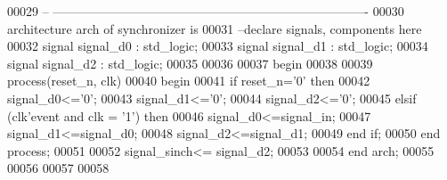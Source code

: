 \begin{DoxyCode}
00029 \textcolor{keyword}{-- ----------------------------------------------------------------------------}
00030 \textcolor{keywordflow}{architecture} arch \textcolor{keywordflow}{of} synchronizer is
00031 \textcolor{keyword}{--declare signals,  components here}
00032 \textcolor{keywordflow}{signal} \textcolor{vhdlchar}{signal_d0} \textcolor{vhdlchar}{:} \textcolor{comment}{std\_logic}; 
00033 \textcolor{keywordflow}{signal} \textcolor{vhdlchar}{signal_d1} \textcolor{vhdlchar}{:} \textcolor{comment}{std\_logic}; 
00034 \textcolor{keywordflow}{signal} \textcolor{vhdlchar}{signal_d2} \textcolor{vhdlchar}{:} \textcolor{comment}{std\_logic}; 
00035 
00036   
00037 \textcolor{vhdlkeyword}{begin}
00038 
00039   \textcolor{keywordflow}{process}(reset_n, clk)
00040 \textcolor{vhdlkeyword}{    begin}
00041       \textcolor{keywordflow}{if} \textcolor{vhdlchar}{reset_n}\textcolor{vhdlchar}{=}\textcolor{vhdlchar}{'}\textcolor{vhdllogic}{}\textcolor{vhdllogic}{0}\textcolor{vhdlchar}{'} \textcolor{keywordflow}{then}
00042         \textcolor{keywordflow}{signal}\textcolor{vhdlchar}{\_d0}\textcolor{vhdlchar}{<=}\textcolor{vhdlchar}{'}\textcolor{vhdllogic}{}\textcolor{vhdllogic}{0}\textcolor{vhdlchar}{'};
00043           \textcolor{keywordflow}{signal}\textcolor{vhdlchar}{\_d1}\textcolor{vhdlchar}{<=}\textcolor{vhdlchar}{'}\textcolor{vhdllogic}{}\textcolor{vhdllogic}{0}\textcolor{vhdlchar}{'};
00044           \textcolor{keywordflow}{signal}\textcolor{vhdlchar}{\_d2}\textcolor{vhdlchar}{<=}\textcolor{vhdlchar}{'}\textcolor{vhdllogic}{}\textcolor{vhdllogic}{0}\textcolor{vhdlchar}{'};
00045         \textcolor{keywordflow}{elsif} \textcolor{vhdlchar}{(}\textcolor{vhdlchar}{clk}\textcolor{vhdlchar}{'}\textcolor{vhdlkeyword}{event} \textcolor{keywordflow}{and} \textcolor{vhdlchar}{clk} \textcolor{vhdlchar}{=} \textcolor{vhdlchar}{'}\textcolor{vhdllogic}{}\textcolor{vhdllogic}{1}\textcolor{vhdlchar}{'}\textcolor{vhdlchar}{)} \textcolor{keywordflow}{then}
00046           \textcolor{keywordflow}{signal}\textcolor{vhdlchar}{\_d0}\textcolor{vhdlchar}{<=}\textcolor{vhdlchar}{signal_in};
00047             \textcolor{keywordflow}{signal}\textcolor{vhdlchar}{\_d1}\textcolor{vhdlchar}{<=}\textcolor{vhdlchar}{signal_d0};
00048             \textcolor{keywordflow}{signal}\textcolor{vhdlchar}{\_d2}\textcolor{vhdlchar}{<=}\textcolor{vhdlchar}{signal_d1};
00049         \textcolor{keywordflow}{end} \textcolor{keywordflow}{if};
00050     \textcolor{keywordflow}{end} \textcolor{keywordflow}{process};
00051      
00052 \textcolor{vhdlchar}{signal_sinch}\textcolor{vhdlchar}{<=}  \textcolor{vhdlchar}{signal_d2}; 
00053   
00054 \textcolor{keywordflow}{end} \textcolor{vhdlchar}{arch};   
00055 
00056 
00057 
00058 
\end{DoxyCode}
